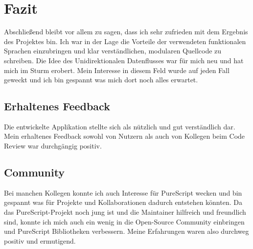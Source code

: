 \section{Fazit}
Abschließend bleibt vor allem zu sagen, dass ich sehr zufrieden mit
dem Ergebnis des Projektes bin. Ich war in der Lage die Vorteile der
verwendeten funktionalen Sprachen einzubringen und klar verständlichen,
modularen Quellcode zu schreiben. Die Idee des Unidirektionalen
Datenflusses war für mich neu und hat mich im Sturm erobert. Mein
Interesse in diesem Feld wurde auf jeden Fall geweckt und ich bin
gespannt was mich dort noch alles erwartet.

\subsection{Erhaltenes Feedback}
Die entwickelte Applikation stellte sich als nützlich und
gut verständlich dar. Mein erhaltenes Feedback sowohl von Nutzern als
auch von Kollegen beim Code Review war durchgängig positiv.

\subsection{Community}
Bei manchen Kollegen konnte ich auch Interesse für
PureScript wecken und bin gespannt was für Projekte und
Kollaborationen dadurch entstehen könnten. Da das PureScript-Projekt
noch jung ist und die Maintainer hilfreich und freundlich sind, konnte
ich mich auch ein wenig in die Open-Source Community einbringen und
PureScript Bibliotheken verbessern. Meine Erfahrungen waren also
durchweg positiv und ermutigend.

